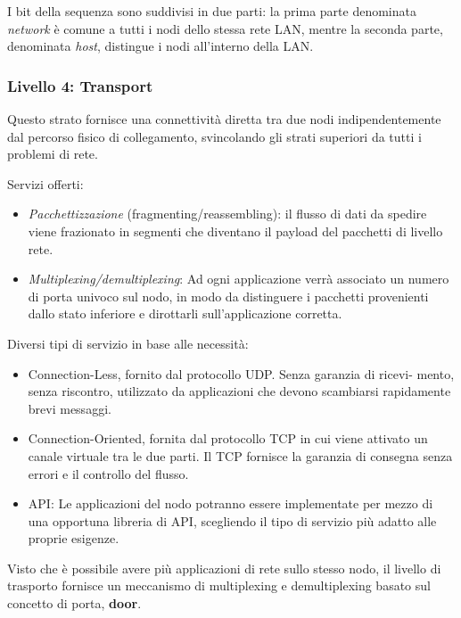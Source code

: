             I bit della sequenza sono suddivisi in due parti: la prima parte denominata \textit{network} è comune a tutti i nodi dello stessa rete LAN, mentre la seconda parte, denominata \textit{host}, distingue i nodi all'interno della LAN.

        \subsubsection{Livello 4: Transport}
            Questo strato fornisce una connettività diretta tra due nodi indipendentemente dal percorso fisico di collegamento, svincolando gli strati superiori da tutti i problemi di rete.
        
            Servizi offerti:
            \begin{itemize}
                \item \textit{Pacchettizzazione} (fragmenting/reassembling): il flusso di dati da spedire viene frazionato in segmenti che diventano il payload del pacchetti di livello rete.
                \item \textit{Multiplexing/demultiplexing}: Ad ogni applicazione verrà associato un numero di porta univoco sul nodo, in modo da distinguere i pacchetti provenienti dallo stato inferiore e dirottarli sull'applicazione corretta.
            \end{itemize}

            Diversi tipi di servizio in base alle necessità:
            \begin{itemize}
                \item Connection-Less, fornito dal protocollo UDP. Senza garanzia di ricevi- mento, senza riscontro, utilizzato da applicazioni che devono scambiarsi rapidamente brevi messaggi.
                \item Connection-Oriented, fornita dal protocollo TCP in cui viene attivato un canale virtuale tra le due parti. Il TCP fornisce la garanzia di consegna senza errori e il controllo del flusso.
                \item API: Le applicazioni del nodo potranno essere implementate per mezzo di una opportuna libreria di API, scegliendo il tipo di servizio più adatto alle proprie esigenze.
            \end{itemize}

            Visto che è possibile avere più applicazioni di rete sullo stesso nodo, il livello di trasporto fornisce un meccanismo di multiplexing e demultiplexing basato sul concetto di porta, \textbf{door}.

